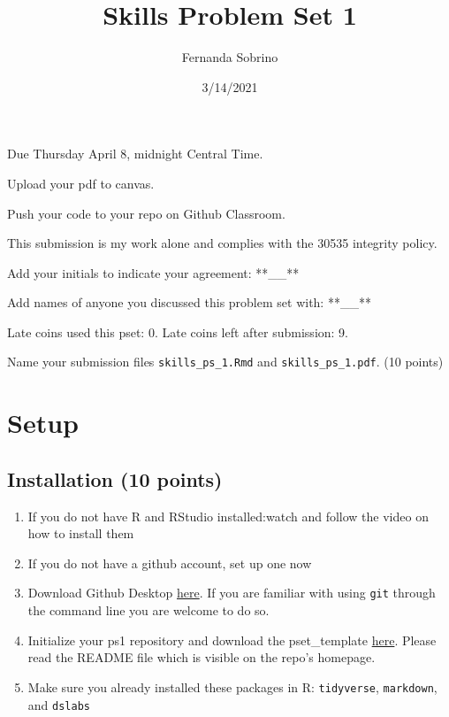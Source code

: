 \documentclass[
]{article}
\title{Skills Problem Set 1}
\author{Fernanda Sobrino}
\date{3/14/2021}
\providecommand{\tightlist}{%
  \setlength{\itemsep}{0pt}\setlength{\parskip}{0pt}}
\begin{document}
\maketitle

Due Thursday April 8, midnight Central Time.

Upload your pdf to canvas.

Push your code to your repo on Github Classroom.

This submission is my work alone and complies with the 30535 integrity
policy.

Add your initials to indicate your agreement: **\_\_**

Add names of anyone you discussed this problem set with: **\_\_**

Late coins used this pset: 0. Late coins left after submission: 9.

Name your submission files \texttt{skills\_ps\_1.Rmd} and
\texttt{skills\_ps\_1.pdf}. (10 points)

\hypertarget{setup}{%
\section{Setup}\label{setup}}

\hypertarget{installation-10-points}{%
\subsection{Installation (10 points)}\label{installation-10-points}}

\begin{enumerate}
\def\labelenumi{\arabic{enumi}.}
\tightlist
\item
  If you do not have R and RStudio installed:watch and follow the video
  on how to install them
\item
  If you do not have a github account, set up one now
\item
  Download Github Desktop \href{https://desktop.github.com/}{here}. If
  you are familiar with using \texttt{git} through the command line you
  are welcome to do so.
\item
  Initialize your ps1 repository and download the pset\_template
  \href{https://classroom.github.com/a/HL4qfScl}{here}. Please read the
  README file which is visible on the repo's homepage.
\item
  Make sure you already installed these packages in R:
  \texttt{tidyverse}, \texttt{markdown}, and \texttt{dslabs}
\end{enumerate}
\end{document}
